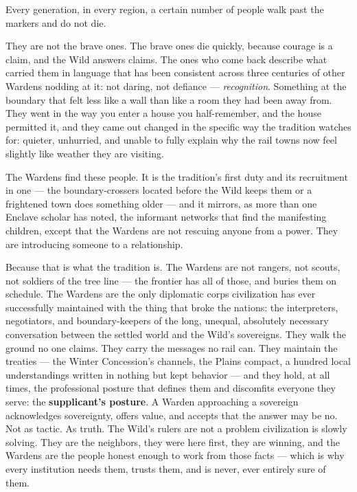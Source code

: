 Every generation, in every region, a certain number of people walk past the markers and do not die.

They are not the brave ones. The brave ones die quickly, because courage is a claim, and the Wild answers claims. The ones who come back describe what carried them in language that has been consistent across three centuries of other Wardens nodding at it: not daring, not defiance --- \textit{recognition}. Something at the boundary that felt less like a wall than like a room they had been away from. They went in the way you enter a house you half-remember, and the house permitted it, and they came out changed in the specific way the tradition watches for: quieter, unhurried, and unable to fully explain why the rail towns now feel slightly like weather they are visiting.

The Wardens find these people. It is the tradition's first duty and its recruitment in one --- the boundary-crossers located before the Wild keeps them or a frightened town does something older --- and it mirrors, as more than one Enclave scholar has noted, the informant networks that find the manifesting children, except that the Wardens are not rescuing anyone from a power. They are introducing someone to a relationship.

Because that is what the tradition is. The Wardens are not rangers, not scouts, not soldiers of the tree line --- the frontier has all of those, and buries them on schedule. The Wardens are the only diplomatic corps civilization has ever successfully maintained with the thing that broke the nations: the interpreters, negotiators, and boundary-keepers of the long, unequal, absolutely necessary conversation between the settled world and the Wild's sovereigns. They walk the ground no one claims. They carry the messages no rail can. They maintain the treaties --- the Winter Concession's channels, the Plains compact, a hundred local understandings written in nothing but kept behavior --- and they hold, at all times, the professional posture that defines them and discomfits everyone they serve: the \textbf{supplicant's posture}. A Warden approaching a sovereign acknowledges sovereignty, offers value, and accepts that the answer may be no. Not as tactic. As truth. The Wild's rulers are not a problem civilization is slowly solving. They are the neighbors, they were here first, they are winning, and the Wardens are the people honest enough to work from those facts --- which is why every institution needs them, trusts them, and is never, ever entirely sure of them.

